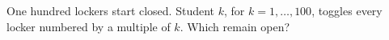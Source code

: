 One hundred lockers start closed. Student $k$, for $k=1,\ldots,100$, toggles every locker numbered by a multiple of $k$. Which remain open?
